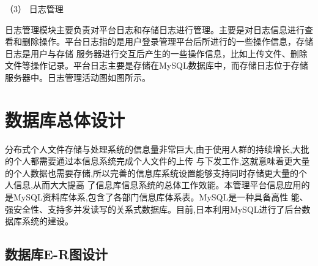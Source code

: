 
（3） 日志管理

日志管理模块主要负责对平台日志和存储日志进行管理。主要是对日志信息进行查看和删除操作。平台日志指的是用户登录管理平台后所进行的一些操作信息，存储日志是用户与存储
服务器进行交互后产生的一些操作信息，比如上传文件、删除文件等操作记录。平台日志主要是存储在MySQL数据库中，而存储日志位于存储服务器中。日志管理活动图如图所示。


\section{数据库总体设计}


分布式个人文件存储与处理系统的信息量非常巨大,由于使用人群的持续增长,大批的个人都需要通过本信息系统完成个人文件的上传
与下发工作,这就意味着更大量的个人数据也需要存储,所以完善的信息库系统设置能够支持同时存储更大量的个人信息,从而大大提高
了信息库信息系统的总体工作效能。本管理平台信息应用的是MySQL资料库体系,包含了各部门信息库体系表。MySQL是一种具备高性
能、强安全性、支持多并发读写的关系式数据库。目前,日本利用MySQL进行了后台数据库系统的建设。

\subsection{数据库E-R图设计}




